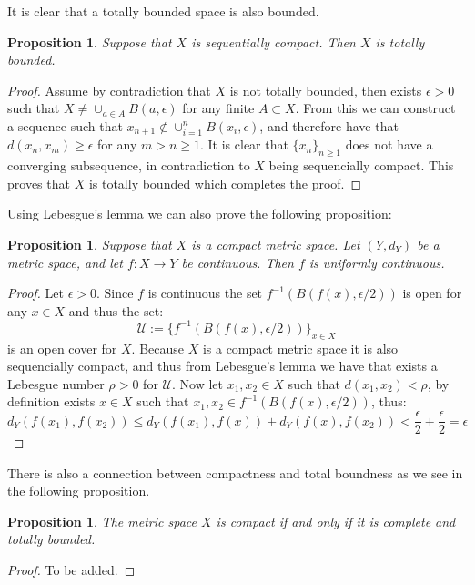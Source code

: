 \documentclass[11pt,a4paper]{article}
\theoremstyle{definition}
\theoremstyle{plain}
\newtheorem{proposition}[theorem]{Proposition}
\begin{document}
  It is clear that a totally bounded space is also bounded. 

  \begin{proposition}
    Suppose that $X$ is sequentially compact. Then $X$ is totally bounded.
  \end{proposition}
  \begin{proof}
    Assume by contradiction that $X$ is not totally bounded, then exists
    $\epsilon > 0$ such that $X \neq \cup_{a \in A} B(a,\epsilon)$ for any
    finite $A \subset X$. From this we can construct a sequence such that
    $x_{n+1} \notin \cup_{i=1}^{n} B(x_i,\epsilon)$, and therefore have
    that $d(x_n,x_m) \geq \epsilon$ for any $m > n \geq 1$. It is clear
    that $\{x_n\}_{n \geq 1}$ does not have a converging subsequence,
    in contradiction to $X$ being sequencially compact. This proves that
    $X$ is totally bounded which completes the proof.
  \end{proof}

  Using Lebesgue's lemma we can also prove the following proposition:
  
  \begin{proposition}
    Suppose that $X$ is a compact metric space. Let $(Y, d_Y)$ be a 
    metric space, and let $f \colon X \to Y$ be continuous. Then $f$ is 
    uniformly continuous.	
  \end{proposition}
  \begin{proof}
    Let $\epsilon > 0$. Since $f$ is continuous the set 
    $f^{-1}(B(f(x),\epsilon/2))$ is open for any $x \in X$ and thus
    the set:
    \[
      \mathcal{U} := \{f^{-1}(B(f(x),\epsilon/2))\}_{x \in X}
    \]
    is an open cover for $X$. Because $X$ is a compact metric space
    it is also sequencially compact, and thus from Lebesgue's lemma
    we have that exists a Lebesgue number $\rho > 0$ for $\mathcal{U}$.
    Now let $x_1,x_2 \in X$ such that $d(x_1,x_2) < \rho$, by definition
    exists $x \in X$ such that $x_1,x_2 \in f^{-1}(B(f(x),\epsilon/2))$,
    thus:
    \[
      d_Y(f(x_1),f(x_2)) \le d_Y(f(x_1),f(x)) + d_Y(f(x),f(x_2)) <
      \frac{\epsilon}{2} + \frac{\epsilon}{2} = \epsilon
    \]
  \end{proof}

  There is also a connection between compactness and total boundness as
  we see in the following proposition.
  
  \begin{proposition}
    The metric space $X$ is compact if and only if it is complete
    and totally bounded.
  \end{proposition}
  \begin{proof}
    To be added.
  \end{proof}
  
\end{document}
